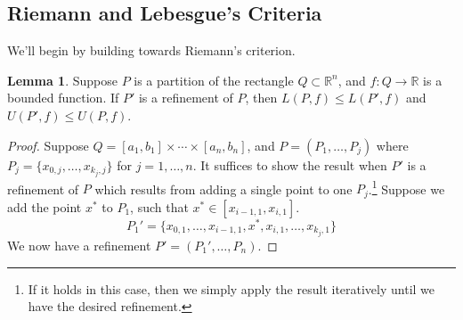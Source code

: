 \documentclass{article}
\newcommand{\R}{\mathbb{R}}
\theoremstyle{definition}
\newtheorem{lemma}{Lemma}[section]
\begin{document}
	\subsection{Riemann and Lebesgue's Criteria}
	We'll begin by building towards Riemann's criterion. 
		\begin{lemma}
			Suppose $ P $ is a partition of the rectangle $ Q\subset \R^n $, and $ f:Q\to \R $ is a bounded function. If $ P' $ is a refinement of $ P $, then $ L(P,f)\le L(P',f) $ and $ U(P',f)\le U(P,f) $.
		\end{lemma}
		\begin{proof}
			Suppose $ Q=[a_1,b_1]\times \cdots  \times [a_n,b_n]$, and $ P=(P_1,\ldots, P_j) $ where $P_j=\{x_{0,j},\ldots , x_{k_j,j}\}$ for $ j=1,\ldots,n $. It suffices to show the result when $ P' $ is a refinement of $ P $ which results from adding a single point to one $ P_j $.\footnote{If it holds in this case, then we simply apply the result iteratively until we have the desired refinement.}
			Suppose we add the point $ x^* $ to $ P_1 $, such that $ x^*\in [x_{i-1,1}, x_{i,1}] $.
			$$ P_1' =\{x_{0,1},\ldots , x_{i-1,1}, x^*, x_{i,1}, \ldots, x_{k_j,1}\}$$ We now have a refinement $ P'=(P_1',\ldots,P_n) $.
			

\end{proof}
\end{document}
